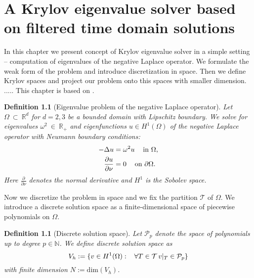 \documentclass[a4paper,11pt,bibliography=totoc,listof=totoc,headinclude=true,cleardoublepage=empty,oneside]{scrbook}
\newtheorem{definition}[theorem]{Definition}
\newcommand{\R}{\mathbb{R}}
\newcommand{\N}{\mathbb{N}}
\begin{document}
\chapter{A Krylov eigenvalue solver based on filtered time domain solutions}
\label{chapter:ftd}
In this chapter we present concept of Krylov eigenvalue solver in a simple setting -- computation of eigenvalues of the negative Laplace operator. We formulate the weak form of the problem and introduce discretization in space. Then we define Krylov spaces and project our problem onto this spaces with smaller dimension. ..... This chapter is based on \cite{nannen}.
\begin{definition}[Eigenvalue problem of the negative Laplace operator]\label{def:ev problem}
    Let $\Omega~\subset~\R^d$ for $d=2,3$ be a bounded domain with Lipschitz boundary. We solve for eigenvalues $\omega^2~\in~\R_{+}$ and eigenfunctions $u\in H^1(\Omega)$ of the negative Laplace operator with Neumann boundary conditions:
        \begin{align}\begin{split}\label{eq:ev problem}
              -\Delta u &= \omega^2 u \hspace{.3cm} \text{ in } \Omega, \\
              \frac{\partial u}{\partial \nu} &= 0 \hspace{.3cm}\text{ on } \partial\Omega.
        \end{split}\end{align}
    Here $\frac{\partial}{\partial\nu}$ denotes the normal derivative and $H^1$ is the Sobolev space. 
\end{definition}
Now we discretize the problem in space and we fix the partition $\mathcal{T}$ of $\Omega$. We introduce a discrete solution space as a finite-dimensional space of piecewise polynomials on $\Omega$. 
\begin{definition}[Discrete solution space]\label{def:solution space}
    Let $\mathcal{P}_p$ denote the space of polynomials up to degree $p \in \N$. We define discrete solution space as  
    \begin{equation*}
        V_h := \{v \in H^1(\Omega): \hspace{.3cm} \forall T \in \mathcal{T} \, v|_T \in \mathcal{P}_p \}
    \end{equation*}
    with finite dimension $N := \mathrm{dim} (V_h)$. 
\end{definition}
\end{document}
